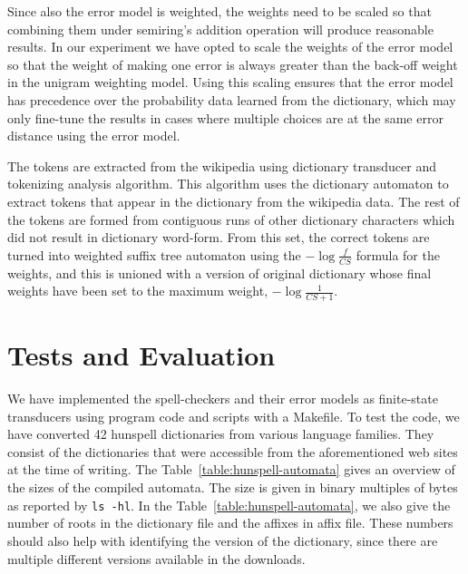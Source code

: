 \documentclass[a4paper,runningheads]{llncs}
\begin{document}
Since also the error model is weighted, the
weights need to be scaled so that combining them under semiring's addition
operation will produce reasonable results. In our experiment we have opted to
scale the weights of the error model so that the weight of making one error is
always greater than the back-off weight in the unigram weighting model. Using
this scaling ensures that the error model has precedence over the probability
data learned from the dictionary, which may only fine-tune the results in cases
where multiple choices are at the same error distance using the error model.

The tokens are extracted from the wikipedia using dictionary transducer and
tokenizing analysis algorithm\cite{garrido-alenda/2002}. This algorithm uses
the dictionary automaton to extract tokens that appear in the dictionary from
the wikipedia data. The rest of the tokens are formed from contiguous runs of
other dictionary characters which did not result in dictionary word-form. From
this set, the correct tokens are turned into weighted suffix tree automaton
using the $-\log\frac{f}{CS}$ formula for the weights, and this is unioned with
a version of original dictionary whose final weights have been set to the
maximum weight, $-\log\frac{1}{CS+1}$.

\section{Tests and Evaluation}

We have implemented the spell-checkers and their error models as finite-state
transducers using program code and scripts with a Makefile.  To test the code,
we have converted 42 hunspell dictionaries from various language families. They
consist of the dictionaries that were accessible from the aforementioned web
sites at the time of writing. The Table~\ref{table:hunspell-automata} gives an
overview of the sizes of the compiled automata. The size is given in binary
multiples of bytes as reported by \texttt{ls -hl}.  In the
Table~\ref{table:hunspell-automata}, we also give the number of roots in the
dictionary file and the affixes in affix file. These numbers should also help
with identifying the version of the dictionary, since there are multiple
different versions available in the downloads.
\end{document}

